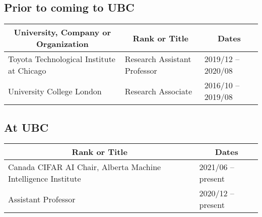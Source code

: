 \documentclass[10pt]{article}
\begin{document}
{\subsection{Prior to coming to UBC}
\noindent\vspace{-2em}
\begin{table}[h!]
  \begin{tabular}{ p{} p{} p{} }
    \toprule
    \multicolumn{1}{c}{\bf University, Company or Organization} & \multicolumn{1}{c}{\bf Rank or Title} & \multicolumn{1}{c}{\bf Dates} \\
    \midrule
    Toyota Technological Institute at Chicago  & Research Assistant Professor  & 2019/12 -- 2020/08 \\
    University College London & Research Associate   & 2016/10 -- 2019/08  \\
    \bottomrule
  \end{tabular}
\end{table}


\vspace{-1em}
\subsection{At UBC}
\noindent\vspace{-2em}
\begin{table}[h!]
  \begin{tabular}{ p{} p{} }
    \toprule
    \multicolumn{1}{c}{\bf Rank or Title} & \multicolumn{1}{c}{\bf Dates} \\
    \midrule
    Canada CIFAR AI Chair, Alberta Machine Intelligence Institute & 2021/06 -- present \\
    Assistant Professor               & 2020/12 -- present        \\
    \bottomrule
  \end{tabular}
\end{table}

}
\end{document}
